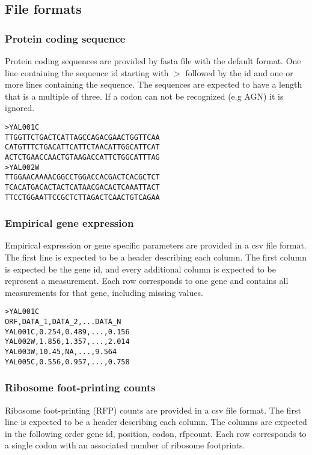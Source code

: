 \subsection{File formats}

\subsubsection{Protein coding sequence}
Protein coding sequences are provided by fasta file with the default format. One line containing the sequence
id starting with $>$ followed by the id and one or more lines containing the sequence. The sequences are
expected to have a length that is a multiple of three. If a codon can not be recognized (e.g AGN) it is ignored.

\begin{verbatim}
>YAL001C
TTGGTTCTGACTCATTAGCCAGACGAACTGGTTCAA
CATGTTTCTGACATTCATTCTAACATTGGCATTCAT
ACTCTGAACCAACTGTAAGACCATTCTGGCATTTAG
>YAL002W
TTGGAACAAAACGGCCTGGACCACGACTCACGCTCT
TCACATGACACTACTCATAACGACACTCAAATTACT
TTCCTGGAATTCCGCTCTTAGACTCAACTGTCAGAA
\end{verbatim}

\subsubsection{Empirical gene expression}

Empirical expression or gene specific parameters are provided in a csv file format. The first line is expected to
be a header describing each column. The first column is expected be the gene id, and every additional column
is expected to be represent a measurement. Each row corresponds to one gene and contains all measurements
for that gene, including missing values.

\begin{verbatim}
>YAL001C
ORF,DATA_1,DATA_2,...DATA_N
YAL001C,0.254,0.489,...,0.156
YAL002W,1.856,1.357,...,2.014
YAL003W,10.45,NA,...,9.564
YAL005C,0.556,0.957,...,0.758
\end{verbatim}

\subsubsection{Ribosome foot-printing counts}

Ribosome foot-printing (RFP) counts are provided in a csv file format. The first line is expected to be a
header describing each column. The columns are expected in the following order gene id, position, codon,
rfpcount. Each row corresponds to a single codon with an associated number of ribosome footprints.

